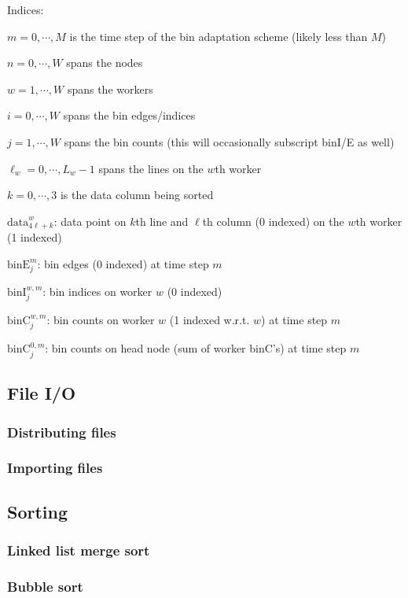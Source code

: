 \documentclass{article}
\newenvironment{tight_enum}{
\begin{enumerate}[label=\alph*.]
\setlength{\itemsep}{0pt}
\setlength{\parskip}{0pt}
}{\end{enumerate}}
\begin{document}
Indices:
\begin{tight_enum}
	\item $m = 0, \cdots, M$ is the time step of the bin adaptation scheme (likely less than $M$)
	\item $n = 0, \cdots, W$ spans the nodes
	\item $w = 1, \cdots, W$ spans the workers
	\item $i = 0, \cdots, W$ spans the bin edges/indices
	\item $j = 1, \cdots, W$ spans the bin counts (this will occasionally subscript binI/E as well)
	\item $\ell_w = 0, \cdots, L_w-1$ spans the lines on the $w$th worker
	\item $k = 0, \cdots, 3$ is the data column being sorted
\end{tight_enum}

$\textrm{data}^w_{4\ell+k}$: data point on $k$th line and $\ell$th column (0 indexed) on the $w$th worker (1 indexed)

$\textrm{binE}^m_j$: bin edges (0 indexed) at time step $m$

$\textrm{binI}^{w,m}_j$: bin indices on worker $w$ (0 indexed)

$\textrm{binC}^{w,m}_j$: bin counts on worker $w$ (1 indexed w.r.t. $w$) at time step $m$

$\textrm{binC}^{0,m}_j$: bin counts on head node (sum of worker binC's) at time step $m$



\subsection{File I/O}
\subsubsection{Distributing files}
\subsubsection{Importing files}


\subsection{Sorting}
\subsubsection{Linked list merge sort}
\subsubsection{Bubble sort}
\end{document}
